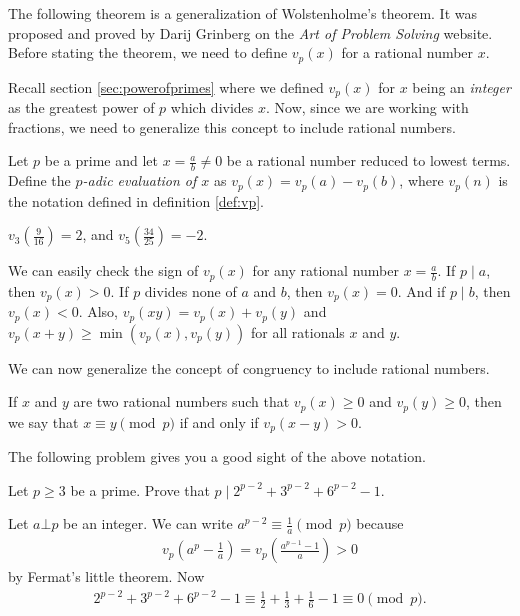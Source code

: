 \documentclass{subfile}
\begin{document}
	The following theorem is a generalization of Wolstenholme's theorem. It was proposed and proved by Darij Grinberg on the \textit{Art of Problem Solving} website. Before stating the theorem, we need to define $v_p(x)$ for a rational number $x$.

	Recall section \eqref{sec:powerofprimes} where we defined $v_p(x)$ for $x$ being an \textit{integer} as the greatest power of $p$ which divides $x$. Now, since we are working with fractions, we need to generalize this concept to include rational numbers.

	\begin{definition}
		Let $p$ be a prime and let $x = \frac{a}{b} \neq 0$ be a rational number reduced to lowest terms. Define the \textit{$p$-adic evaluation of $x$} as $v_p(x) = v_p(a)-v_p(b)$, where $v_p(n)$ is the notation defined in definition \eqref{def:vp}.
	\end{definition}

	\begin{example}
		$v_3\left(\frac{9}{16}\right) = 2$, and $v_5\left(\frac{34}{25}\right) = -2$.
	\end{example}

	\begin{note}
		We can easily check the sign of $v_p(x)$ for any rational number $x=\frac{a}{b}$. If $p\mid a$, then $v_p(x)>0$. If $p$ divides none of $a$ and $b$, then $v_p(x)=0$. And if $p\mid b$, then $v_p(x)<0$. Also,  $ v_{p}\left(xy\right) = v_{p}\left(x\right) + v_{p}\left(y\right)$ and $ v_{p}\left(x + y\right)\geq\min\left(v_{p}\left(x\right),v_{p}\left(y\right)\right)$ for all rationals $x$ and $y$.
	\end{note}

	We can now generalize the concept of congruency to include rational numbers.
	\begin{definition}
		If $x$ and $y$ are two rational numbers such that $ v_{p}\left(x\right)\geq 0$ and $ v_{p}\left(y\right)\geq 0$, then we say that $ x\equiv y\pmod p$ if and only if $ v_{p}\left(x - y\right) > 0$.
	\end{definition}

	The following problem gives you a good sight of the above notation.

	\begin{problem}
		Let $p \geq 3$ be a prime. Prove that $p\mid 2^{p-2}+3^{p-2}+6^{p-2}-1$.
	\end{problem}

	\begin{solution}
		Let $a \bot p$ be an integer. We can write $a^{p-2} \equiv \frac{1}{a} \pmod p$ because
			\begin{align*}
				v_p\left(a^p - \frac{1}{a}\right)=v_p\left(\frac{a^{p-1}-1}{a}\right)>0
			\end{align*}
		by Fermat's little theorem. Now
		\begin{align*}
		2^{p-2}+3^{p-2}+6^{p-2}-1 \equiv \frac{1}{2}+\frac{1}{3}+\frac{1}{6}-1 \equiv 0 \pmod p.
		\end{align*}
	\end{solution}
\end{document}
